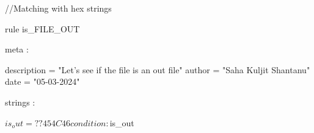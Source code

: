 \begin{yaracode}

//Matching with hex strings

rule is_FILE_OUT {

    meta : 

        description = "Let's see if the file is an out file"
        author = "Saha Kuljit Shantanu"
        date = "05-03-2024"

    strings :

        $is_out = { ?? 45 4C 46 }

    condition:

        $is_out


}

\end{yaracode}